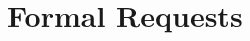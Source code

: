 
%
%
%
%
%
%
%
%
%
%
%
%
%
%
%
%
%
%
%

\requestsPartSettings

\part{Formal Requests}

\requestsChapterSettings



\requestsSettingsRestore

